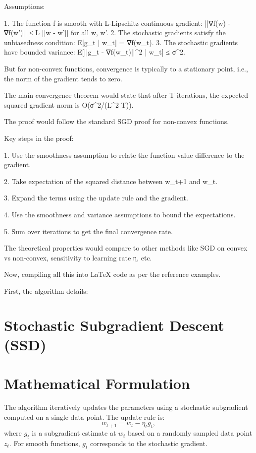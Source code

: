 Assumptions:

1. The function f is smooth with L-Lipschitz continuous gradient: ||∇f(w) - ∇f(w')|| ≤ L ||w - w'|| for all w, w'.
2. The stochastic gradients satisfy the unbiasedness condition: E[g_t | w_t] = ∇f(w_t).
3. The stochastic gradients have bounded variance: E[||g_t - ∇f(w_t)||^2 | w_t] ≤ σ^2.

But for non-convex functions, convergence is typically to a stationary point, i.e., the norm of the gradient tends to zero.

The main convergence theorem would state that after T iterations, the expected squared gradient norm is O(σ^2/(L^2 T)).

The proof would follow the standard SGD proof for non-convex functions.

Key steps in the proof:

1. Use the smoothness assumption to relate the function value difference to the gradient.

2. Take expectation of the squared distance between w_{t+1} and w_t.

3. Expand the terms using the update rule and the gradient.

4. Use the smoothness and variance assumptions to bound the expectations.

5. Sum over iterations to get the final convergence rate.

The theoretical properties would compare to other methods like SGD on convex vs non-convex, sensitivity to learning rate η, etc.

Now, compiling all this into LaTeX code as per the reference examples.

First, the algorithm details:

\section*{Stochastic Subgradient Descent (SSD)}

\section*{Mathematical Formulation}

The algorithm iteratively updates the parameters using a stochastic subgradient computed on a single data point. The update rule is:
\[
w_{t+1} = w_t - \eta_t g_t,
\]
where \( g_t \) is a subgradient estimate at \( w_t \) based on a randomly sampled data point \( z_t \). For smooth functions, \( g_t \) corresponds to the stochastic gradient.

